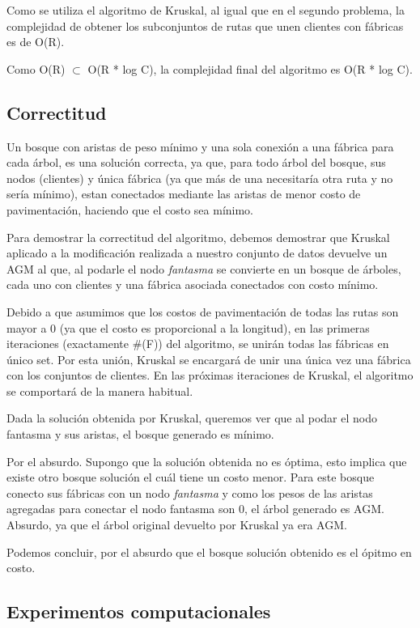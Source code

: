 \documentclass[a4paper, 10pt, twoside]{article}
\begin{document}
Como se utiliza el algoritmo de Kruskal, al igual que en el segundo problema, la complejidad de obtener los subconjuntos de rutas que unen clientes con fábricas es de O(R).

Como O(R) $\subset$ O(R * log C), la complejidad final del algoritmo es O(R * log C).
\subsection{Correctitud}
Un bosque con aristas de peso mínimo y una sola conexión a una fábrica para cada árbol, es una solución correcta, ya que, para todo árbol del bosque, sus nodos (clientes) y única fábrica (ya que más de una necesitaría otra ruta y no sería mínimo), estan conectados mediante las aristas de menor costo de pavimentación, haciendo que el costo sea mínimo.

Para demostrar la correctitud del algoritmo, debemos demostrar que Kruskal aplicado a la modificación realizada a nuestro conjunto de datos devuelve un AGM al que, al podarle el nodo \textit{fantasma} se convierte en un bosque de árboles, cada uno con clientes y una fábrica asociada conectados con costo mínimo.

Debido a que asumimos que los costos de pavimentación de todas las rutas son mayor a 0 (ya que el costo es proporcional a la longitud), en las primeras iteraciones (exactamente \#(F)) del algoritmo, se unirán todas las fábricas en único set. Por esta unión, Kruskal se encargará de unir una única vez una fábrica con los conjuntos de clientes. En las próximas iteraciones de Kruskal, el algoritmo se comportará  de la manera habitual.

Dada la solución obtenida por Kruskal, queremos ver que al podar el nodo fantasma y sus aristas, el bosque generado es mínimo.

Por el absurdo. Supongo que la solución obtenida no es óptima, esto implica que existe otro bosque solución el cuál tiene un costo menor. Para este bosque conecto sus fábricas con un nodo \textit{fantasma} y como los pesos de las aristas agregadas para conectar el nodo fantasma son 0, el árbol generado es AGM. Absurdo, ya que el árbol original devuelto por Kruskal ya era AGM.

Podemos concluir, por el absurdo que el bosque solución obtenido es el ópitmo en costo.


\subsection{Experimentos computacionales}
\end{document}
